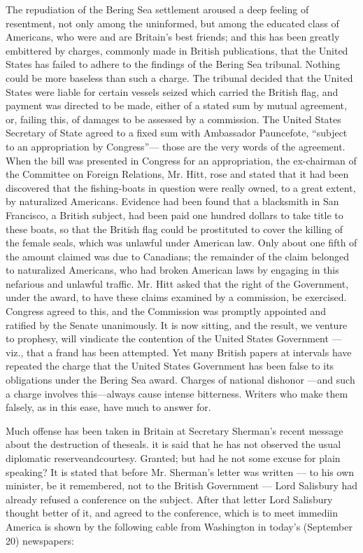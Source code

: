 \documentclass[11pt,openany]{book}
\begin{document}
The repudiation of the Bering Sea settlement aroused a deep feeling of resentment, not only among the uninformed, but among the educated class of Americans, who were and are Britain's best friends; and this has been greatly embittered by charges, commonly made in British publications, that the United States has failed to adhere to the findings of the Bering Sea tribunal. Nothing could be more baseless than such a charge. The tribunal decided that the United States were liable for certain vessels seized which carried the British flag, and payment was directed to be made, either of a stated sum by mutual agreement, or, failing this, of damages to be assessed by a commission. The United States Secretary of State agreed to a fixed sum with Ambassador Pauncefote, ``subject to an appropriation by Congress''--- those are the very words of the agreement. When the bill was presented in Congress for an appropriation, the ex-chairman of the Committee on Foreign Relations, Mr. Hitt, rose and stated that it had been discovered that the fishing-boats in question were really owned, to a great extent, by naturalized Americans. Evidence had been found that a blacksmith in San Francisco, a British subject, had been paid one hundred dollars to take title to these boats, so that the British flag could be prostituted to cover the killing of the female seals, which was unlawful under American law. Only about one fifth of the amount claimed was due to Canadians; the remainder of the claim belonged to naturalized Americans, who had broken American laws by engaging in this nefarious and unlawful traffic. Mr. Hitt asked that the right of the Government, under the award, to have these claims examined by a commission, be exercised. Congress agreed to this, and the Commission was promptly appointed and ratified by the Senate unanimously. It is now sitting, and the result, we venture to prophesy, will vindicate the contention of the United States Government ---viz., that a frand has been attempted. Yet many British papers at intervals have repeated the charge that the United States Government has been false to its obligations under the Bering Sea award. Charges of national dishonor ---and such a charge involves this---always cause intense bitterness. Writers who make them falsely, as in this ease, have much to answer for.

Much offense has been taken in Britain at Secretary Sherman's recent message about the destruction of theseals. it is said that he has not observed the usual diplomatic reserveandcourtesy. Granted; but had he not some excuse for plain speaking? It is stated that before Mr. Sherman's letter was written --- to his own minister, be it remembered, not to the British Government --- Lord Salisbury had already refused a conference on the subject. After that letter Lord Salisbury thought better of it, and agreed to the conference, which is to meet immediin America is shown by the following cable from Washington in today's (September 20) newspapers:
\end{document}
